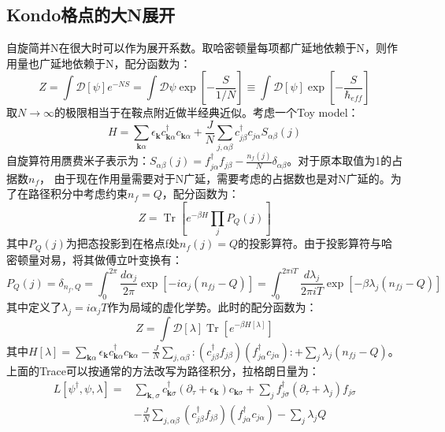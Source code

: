 \documentclass[10pt,openany]{book}
\theoremstyle{thmstyle} %
\theoremstyle{defstyle} %
\theoremstyle{prostyle} %
\begin{document}
\subsection{Kondo格点的大N展开}
自旋简并N在很大时可以作为展开系数。取哈密顿量每项都广延地依赖于N，则作用量也广延地依赖于N，配分函数为：
\begin{equation}
	Z=\int \mathcal{D}[\psi] e^{-N S}=\int \mathcal{D} \psi \exp \left[-\frac{S}{1 / N}\right] \equiv \int \mathcal{D}[\psi] \exp \left[-\frac{S}{\hbar_{e f f}}\right]
\end{equation}
取$ N\to \infty $的极限相当于在鞍点附近做半经典近似。考虑一个Toy model：
\begin{equation}
	H=\sum_{\mathbf{k} \alpha} \epsilon_{\mathbf{k}} c_{\mathbf{k} \alpha}^{\dagger} c_{\mathbf{k} \alpha}+\frac{J}{N} \sum_{j, \alpha \beta} c_{j \beta}^{\dagger} c_{j \alpha} S_{\alpha \beta}(j)
\end{equation} 
自旋算符用赝费米子表示为：$ S_{\alpha \beta}(j)=f_{j \alpha}^{\dagger} f_{j \beta}-\frac{n_f(j)}{N} \delta_{\alpha \beta} $。对于原本取值为1的占据数$ n_f $，
由于现在作用量需要对于N广延，需要考虑的占据数也是对N广延的。为了在路径积分中考虑约束$ n_f=Q $，配分函数为：
\begin{equation}
	Z=\operatorname{Tr}\left[e^{-\beta H} \prod_j P_Q(j)\right]
\end{equation}   
其中$ P_Q(j) $为把态投影到在格点f处$ n_f(j)=Q $的投影算符。由于投影算符与哈密顿量对易，将其做傅立叶变换有：
\begin{equation}
	P_Q(j)=\delta_{n_f, Q}=\int_0^{2 \pi} \frac{d \alpha_j}{2 \pi} \exp \left[-i \alpha_j\left(n_{f j}-Q\right)\right]=\int_0^{2 \pi i T} \frac{d \lambda_j}{2 \pi i T} \exp \left[-\beta \lambda_j\left(n_{f j}-Q\right)\right]
\end{equation}  
其中定义了$ \lambda_j=i \alpha_j T $作为局域的虚化学势。此时的配分函数为：
\begin{equation}
	Z=\int \mathcal{D}[\lambda] \operatorname{Tr}\left[e^{-\beta H[\lambda]}\right]
\end{equation}
其中$ H[\lambda]=\sum_{\mathbf{k} \alpha} \epsilon_{\mathbf{k}} c_{\mathbf{k} \alpha}^{\dagger} c_{\mathbf{k} \alpha}-\frac{J}{N} \sum_{j, \alpha \beta}:\left(c_{j \beta}^{\dagger} f_{j \beta}\right)\left(f_{j \alpha}^{\dagger} c_{j \alpha}\right):+\sum_j \lambda_j\left(n_{f j}-Q\right) $。 
上面的Trace可以按通常的方法改写为路径积分，拉格朗日量为：
\begin{equation}
	\begin{aligned}
		L\left[\psi^{\dagger}, \psi, \lambda\right]= & \sum_{\mathbf{k}, \sigma} c_{\mathbf{k} \sigma}^{\dagger}\left(\partial_\tau+\epsilon_{\mathbf{k}}\right) c_{\mathbf{k} \sigma}+\sum_j f_{j \sigma}^{\dagger}\left(\partial_\tau+\lambda_j\right) f_{j \sigma} \\
		& -\frac{J}{N} \sum_{j, \alpha \beta}\left(c_{j \beta}^{\dagger} f_{j \beta}\right)\left(f_{j \alpha}^{\dagger} c_{j \alpha}\right)-\sum_j \lambda_j Q
		\end{aligned}
\end{equation}
\end{document}
